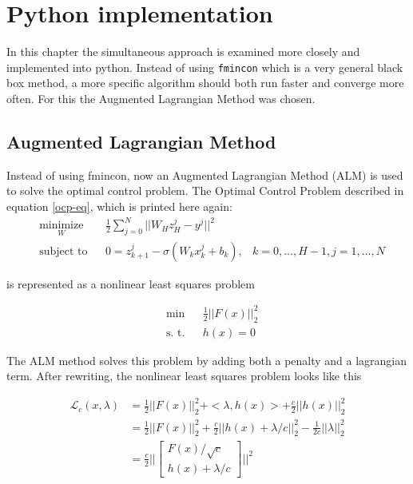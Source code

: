 \chapter{Python implementation}
\label{cha:2}
In this chapter the simultaneous approach is examined more closely and implemented into python. Instead of using \texttt{fmincon} which is a very general black box method, a more specific algorithm should both run faster and converge more often. For this the Augmented Lagrangian Method was chosen.

\section{Augmented Lagrangian Method}
Instead of using fmincon, now an Augmented Lagrangian Method (ALM) is used to solve the optimal control problem. The Optimal Control Problem described in equation \ref{ocp-eq}, which is printed here again:
\begin{equation*}
	\begin{aligned}
	& \underset{W}{\text{minimize}}
	& & \frac{1}{2}\sum\limits_{j=0}^{N}||W_Hz_H^j - y^j||^2 \\
	& \text{subject to}
	& & 0  = z_{k+1}^j - \sigma(W_kx_k^j + b_k), &k = 0,\ldots,H-1,j = 1,\ldots,N
	\end{aligned}
\end{equation*}

is represented as a nonlinear least squares problem

\begin{equation*}
	\begin{aligned}
	& \text{min}
	&  & \frac{1}{2} ||F(x)||^2_2 \\
	& \text{s. t.}
	& &  h(x) = 0
	\end{aligned}
\end{equation*}

The ALM method solves this problem by adding both a penalty and a lagrangian term. After rewriting, the nonlinear least squares problem looks like this

\begin{equation}
	\begin{aligned}
		\mathcal{L}_c(x,\lambda)
		&= \frac{1}{2} ||F(x)||^2_2 + <\lambda,h(x)> + \frac{c}{2} || h(x) ||^2_2 \\
		&= \frac{1}{2} ||F(x)||^2_2 + \frac{c}{2} ||h(x) + \lambda/c ||^2_2 - \frac{1}{2c} ||\lambda||^2_2 \\
		&= \frac{c}{2} \Big|\Big|
		\begin{bmatrix}
			F(x)/\sqrt{c} \\
			h(x) + \lambda/c
		\end{bmatrix} \Big|\Big|^2
	\end{aligned}
	\label{loss}
\end{equation}

